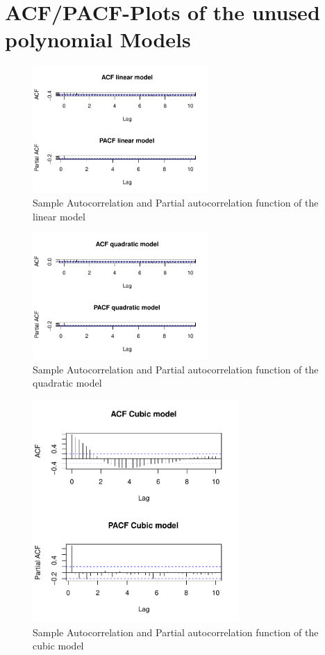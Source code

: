 \documentclass[11pt,a4paper]{article}
\begin{document}
\section{ACF/PACF-Plots of the unused polynomial Models}
\label{sec:ACFPACFunused}
\begin{figure} 
\centering
\includegraphics[angle=0,
width=0.6\textwidth]{acf_pacf_linearmodel}
\caption{Sample Autocorrelation and Partial autocorrelation function of the linear model
\label{fig:acf_pacf_linearmodel}}
\end{figure}
\begin{figure} 
\centering
\includegraphics[angle=0,
width=0.6\textwidth]{acf_pacf_quadraticmodel}
\caption{Sample Autocorrelation and Partial autocorrelation function of the quadratic model
\label{fig:acf_pacf_quadraticmodel}}
\end{figure}
\begin{figure} 
\centering
\includegraphics[angle=0,
width=0.7\textwidth]{acf_pacf_cubicmodel}
\caption{Sample Autocorrelation and Partial autocorrelation function of the cubic model
\label{fig:acf_pacf_cubicmodel}}
\end{figure}
\end{document}
